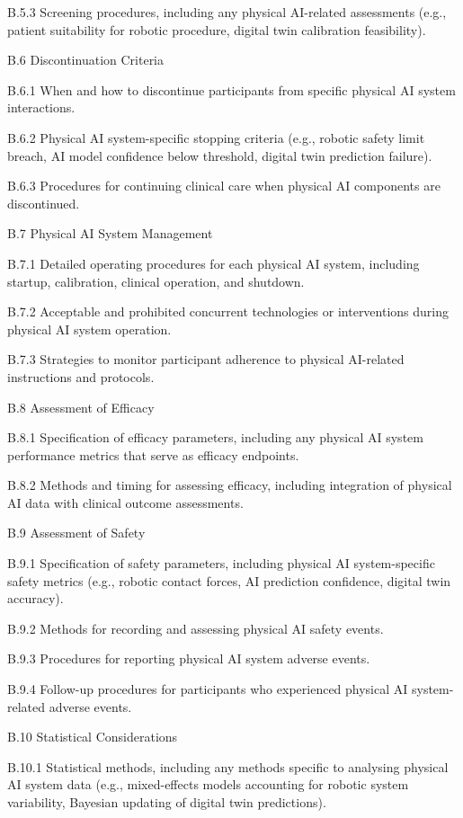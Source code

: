 B.5.3 Screening procedures, including any physical AI-related assessments (e.g., patient suitability for robotic procedure, digital twin calibration feasibility).

B.6 Discontinuation Criteria

B.6.1 When and how to discontinue participants from specific physical AI system interactions.

B.6.2 Physical AI system-specific stopping criteria (e.g., robotic safety limit breach, AI model confidence below threshold, digital twin prediction failure).

B.6.3 Procedures for continuing clinical care when physical AI components are discontinued.

B.7 Physical AI System Management

B.7.1 Detailed operating procedures for each physical AI system, including startup, calibration, clinical operation, and shutdown.

B.7.2 Acceptable and prohibited concurrent technologies or interventions during physical AI system operation.

B.7.3 Strategies to monitor participant adherence to physical AI-related instructions and protocols.

B.8 Assessment of Efficacy

B.8.1 Specification of efficacy parameters, including any physical AI system performance metrics that serve as efficacy endpoints.

B.8.2 Methods and timing for assessing efficacy, including integration of physical AI data with clinical outcome assessments.

B.9 Assessment of Safety

B.9.1 Specification of safety parameters, including physical AI system-specific safety metrics (e.g., robotic contact forces, AI prediction confidence, digital twin accuracy).

B.9.2 Methods for recording and assessing physical AI safety events.

B.9.3 Procedures for reporting physical AI system adverse events.

B.9.4 Follow-up procedures for participants who experienced physical AI system-related adverse events.

B.10 Statistical Considerations

B.10.1 Statistical methods, including any methods specific to analysing physical AI system data (e.g., mixed-effects models accounting for robotic system variability, Bayesian updating of digital twin predictions).

